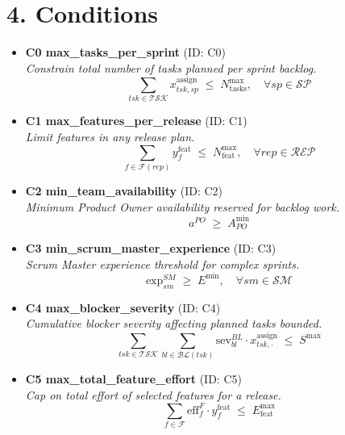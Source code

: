 \documentclass[11pt,a4paper]{article}
\begin{document}
\section{4. Conditions}
\begin{itemize}[leftmargin=2em]
  \item \textbf{C0 max\_tasks\_per\_sprint} \; (ID: C0)\\
  \emph{Constrain total number of tasks planned per sprint backlog.}\\
  \[
     \sum_{tsk \in \mathcal{TSK}} x^{\text{assign}}_{tsk,sp} \;\le\; N^{\max}_{\text{tasks}}, \quad \forall sp \in \mathcal{SP}
  \]

  \item \textbf{C1 max\_features\_per\_release} \; (ID: C1)\\
  \emph{Limit features in any release plan.}\\
  \[
     \sum_{f \in \mathcal{F}(rep)} y^{\text{feat}}_{f} \;\le\; N^{\max}_{\text{feat}}, \quad \forall rep \in \mathcal{REP}
  \]

  \item \textbf{C2 min\_team\_availability} \; (ID: C2)\\
  \emph{Minimum Product Owner availability reserved for backlog work.}\\
  \[
     a^{PO} \;\ge\; A^{\min}_{PO}
  \]

  \item \textbf{C3 min\_scrum\_master\_experience} \; (ID: C3)\\
  \emph{Scrum Master experience threshold for complex sprints.}\\
  \[
     \text{exp}^{SM}_{sm} \;\ge\; E^{\min}, \quad \forall sm \in \mathcal{SM}
  \]

  \item \textbf{C4 max\_blocker\_severity} \; (ID: C4)\\
  \emph{Cumulative blocker severity affecting planned tasks bounded.}\\
  \[
     \sum_{tsk \in \mathcal{TSK}} \sum_{bl \in \mathcal{BL}(tsk)} \text{sev}^{BL}_{bl} \cdot x^{\text{assign}}_{tsk,\cdot} \;\le\; S^{\max}
  \]

  \item \textbf{C5 max\_total\_feature\_effort} \; (ID: C5)\\
  \emph{Cap on total effort of selected features for a release.}\\
  \[
     \sum_{f \in \mathcal{F}} \text{eff}^{F}_f \cdot y^{\text{feat}}_{f} \;\le\; E^{\max}_{\text{feat}}
  \]


\end{itemize}
\end{document}
